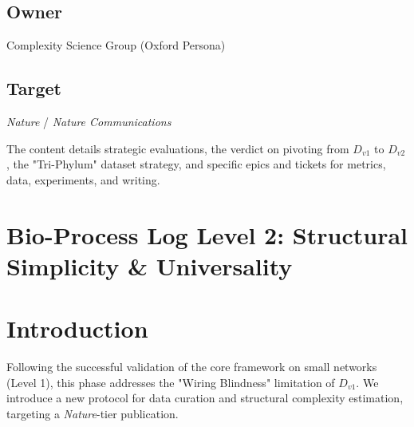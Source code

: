 \documentclass{article}
\begin{document}
\subsection{Owner}
Complexity Science Group (Oxford Persona)

\subsection{Target}
\textit{Nature} / \textit{Nature Communications}

The content details strategic evaluations, the verdict on pivoting from $D_{v1}$ to $D_{v2}$, the "Tri-Phylum" dataset strategy, and specific epics and tickets for metrics, data, experiments, and writing.

\section{Bio-Process Log Level 2: Structural Simplicity \& Universality}



\begin{abstract}
\textbf{Executive Summary.} This document logs the "Level 2" execution of the Causal Boolean Integration project, focusing on the development of Structural Description Length ($D_{v2}$) and its validation on a rigorously curated dataset of biological networks. We aim to demonstrate that algorithmic simplicity is a universal property of life, transcending specific phyla or functions.

\textbf{Key Objectives:}
\begin{enumerate}
    \item \textbf{High-Fidelity Curation:} Establishment of the "Tri-Phylum" dataset ($N=10$ networks), manually curated from primary literature to guarantee logical ground truth.
    \item \textbf{Structural Metrics:} Implementation of $D_{v2}$ to capture the complexity of wiring patterns (motifs, hierarchy) missed by node-centric metrics.
    \item \textbf{Universality:} Validation of the simplicity hypothesis across Maintainers (Homeostasis), Deciders (Fate), and Processors (Signaling).
\end{enumerate}
\end{abstract}

\section{Introduction}
Following the successful validation of the core framework on small networks (Level 1), this phase addresses the "Wiring Blindness" limitation of $D_{v1}$. We introduce a new protocol for data curation and structural complexity estimation, targeting a \textit{Nature}-tier publication.
\end{document}

